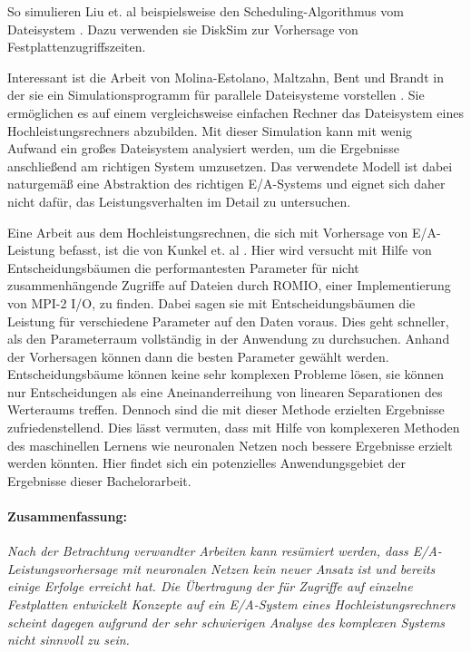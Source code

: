 \documentclass[
	12pt,
	a4paper,
	BCOR10mm,
	DIV14,
	listof=totoc,
	bibliography=totoc,
	headsepline
]{scrreprt}
\begin{document}
So simulieren Liu et. al beispielsweise den Scheduling-Algorithmus vom Dateisystem \cite{liu2011towards}. Dazu verwenden sie DiskSim \cite{Bucy08thedisksim} zur Vorhersage von Festplattenzugriffszeiten.

Interessant ist die Arbeit von Molina-Estolano, Maltzahn, Bent und Brandt in der sie ein Simulationsprogramm für parallele Dateisysteme vorstellen \cite{molina2009building}. Sie ermöglichen es auf einem vergleichsweise einfachen Rechner das Dateisystem eines Hochleistungsrechners abzubilden. Mit dieser Simulation kann mit wenig Aufwand ein großes Dateisystem analysiert werden, um die Ergebnisse anschließend am richtigen System umzusetzen. Das verwendete Modell ist dabei naturgemäß eine Abstraktion des richtigen E/A-Systems und eignet sich daher nicht dafür, das Leistungsverhalten im Detail zu untersuchen.

Eine Arbeit aus dem Hochleistungsrechnen, die sich mit Vorhersage von E/A-Leistung befasst, ist die von Kunkel et. al \cite{UMLTPTPONI15}. Hier wird versucht mit Hilfe von Entscheidungsbäumen die performantesten Parameter für nicht zusammenhängende Zugriffe auf Dateien durch ROMIO, einer Implementierung von MPI-2 I/O, zu finden.
Dabei sagen sie mit Entscheidungsbäumen die Leistung für verschiedene Parameter auf den Daten voraus. Dies geht schneller, als den Parameterraum vollständig in der Anwendung zu durchsuchen. Anhand der Vorhersagen können dann die besten Parameter gewählt werden.
Entscheidungsbäume können keine sehr komplexen Probleme lösen, sie können nur Entscheidungen als eine Aneinanderreihung von linearen Separationen des Werteraums treffen. Dennoch sind die mit dieser Methode erzielten Ergebnisse zufriedenstellend. Dies lässt vermuten, dass mit Hilfe von komplexeren Methoden des maschinellen Lernens wie neuronalen Netzen noch bessere Ergebnisse erzielt werden könnten.
Hier findet sich ein potenzielles Anwendungsgebiet der Ergebnisse dieser Bachelorarbeit.

\paragraph{Zusammenfassung:}
\textit{
	Nach der Betrachtung verwandter Arbeiten kann resümiert werden, dass E/A-Leistungsvorhersage mit neuronalen Netzen kein neuer Ansatz ist und bereits einige Erfolge erreicht hat. Die Übertragung der für Zugriffe auf einzelne Festplatten entwickelt Konzepte auf ein E/A-System eines Hochleistungsrechners scheint dagegen aufgrund der sehr schwierigen Analyse des komplexen Systems nicht sinnvoll zu sein.
}
\end{document}
